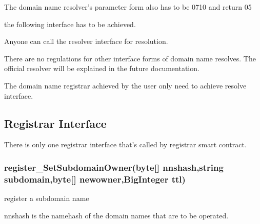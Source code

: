 \documentclass[letterpaper,10pt,english]{sphinxmanual}
\begin{document}
The domain name resolver’s parameter form also has to be 0710 and return 05

the following interface has to be achieved.

%
\begin{sphinxVerbatim}[commandchars=\\\{\}]
  \PYG{p}{[}\PYG{p}{]}   \PYG{p}{[}\PYG{p}{]} 
       
         \PYG{p}{[}\PYG{p}{]} \PYG{p}{[}\PYG{p}{]}\PYG{p}{[}\PYG{p}{]}

 \PYG{p}{[}\PYG{p}{]} 
\end{sphinxVerbatim}

Anyone can call the resolver interface for resolution.

There are no regulations for other interface forms of domain name resolves. The official resolver will be explained in the future documentation.

The domain name registrar achieved by the user only need to achieve resolve interface.


\subsection{Registrar Interface}
\label{\detokenize{nns_protocol:registrar-interface}}
There is only one registrar interface that’s called by registrar smart contract.


\subsubsection{register\_SetSubdomainOwner(byte{[}{]} nnshash,string subdomain,byte{[}{]} newowner,BigInteger ttl)}
\label{\detokenize{nns_protocol:register-setsubdomainowner-byte-nnshash-string-subdomain-byte-newowner-biginteger-ttl}}
register a subdomain name

nnshash is the namehash of the domain names that are to be operated.
\end{document}
